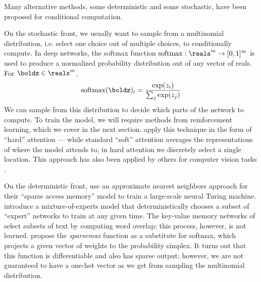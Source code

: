 \documentclass[12pt]{report}
\begin{document}
Many alternative methods, some deterministic and some stochastic, have been proposed for conditional computation. 

On the stochastic front, we usually want to sample from a multinomial distribution, i.e. select one choice out of multiple choices, to conditionally compute. In deep networks, the softmax function $\operatorname{softmax} : \reals^m \to [0,1]^m$ is used to produce a normalized probability distribution out of any vector of reals. For $\boldz \in \reals^m$,
\begin{equation}
\operatorname{softmax}(\boldz)_i = \frac{\exp(z_i)}{\sum_j \exp(z_j)}
\end{equation}
We can sample from this distribution to decide which parts of the network to compute. To train the model, we will require methods from reinforcement learning, which we cover in the next section. \citet{xu2015captioning} apply this technique in the form of ``hard'' attention --- while standard ``soft'' attention averages the representations of where the model attends to, in hard attention we discretely select a single location.
This approach has also been applied by others for computer vision tasks \citep{mnih2014visualattention, ba2015visualattention}.



On the deterministic front, \citet{rae2016sparsememory} use an approximate nearest neighbors approach for their ``sparse access memory'' model to train a large-scale neural Turing machine.
\citet{Shazeer2017} introduce a mixture-of-experts model that deterministically chooses a subset of ``expert'' networks to train at any given time.
The key-value memory networks of \citet{Miller2016} select subsets of text by computing word overlap; this process, however, is not learned.
 \citet{martins2016sparsemax} propose the \emph{sparsemax} function as a substitute for softmax, which projects a given vector of weights to the probability simplex. It turns out that this function is differentiable and also has sparse output; however, we are not guaranteed to have a one-hot vector as we get from sampling the multinomial distribution.
\end{document}
